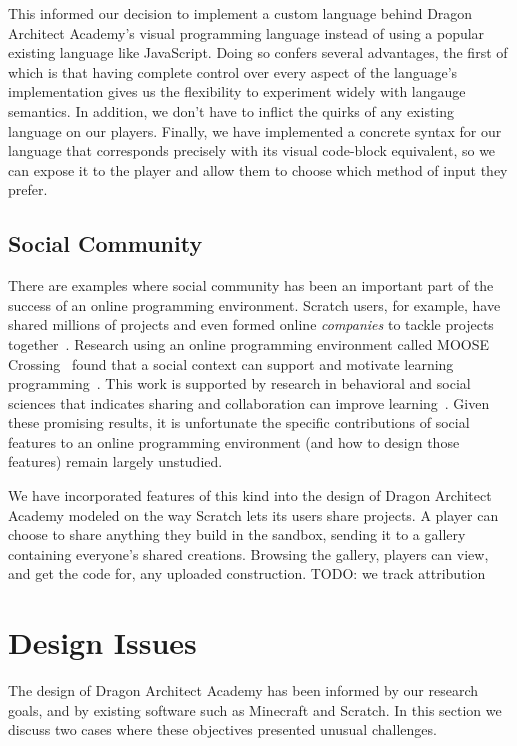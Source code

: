 \documentclass{sig-alternate}
\newcommand{\TODO}[1]{{\color{red} TODO: #1}}
\newcommand{\gametitle}{{\color{RoyalPurple} Dragon Architect Academy}}
\begin{document}
This informed our decision to implement a custom language behind \gametitle{}'s visual programming language instead of using a popular existing language like JavaScript. 
Doing so confers several advantages, the first of which is that having complete control over every aspect of the language's implementation gives us the flexibility to experiment widely with langauge semantics. 
In addition, we don't have to inflict the quirks of any existing language on our players. 
Finally, we have implemented a concrete syntax for our language that corresponds precisely with its visual code-block equivalent, so we can expose it to the player and allow them to choose which method of input they prefer. 

\subsection{Social Community}
There are examples where social community has been an important part of the success of an online programming environment. 
Scratch users, for example, have shared millions of projects and even formed online \emph{companies} to tackle projects together~\cite{resnick2009scratch}. 
Research using an online programming environment called MOOSE Crossing~\cite{bruckman1997moose} found that a social context can support and motivate learning programming~\cite{bruckman2000situated}.
This work is supported by research in behavioral and social sciences that indicates sharing and collaboration can improve learning~\cite{bransford2000people}. 
Given these promising results, it is unfortunate the specific contributions of social features to an online programming environment (and how to design those features) remain largely unstudied.

We have incorporated features of this kind into the design of \gametitle{} modeled on the way Scratch lets its users share projects. 
A player can choose to share anything they build in the sandbox, sending it to a gallery containing everyone's shared creations.
Browsing the gallery, players can view, and get the code for, any uploaded construction.
\TODO{we track attribution}

\section{Design Issues}
The design of \gametitle{} has been informed by our research goals, and by existing software such as Minecraft and Scratch. 
In this section we discuss two cases where these objectives presented unusual challenges. 
\end{document}
